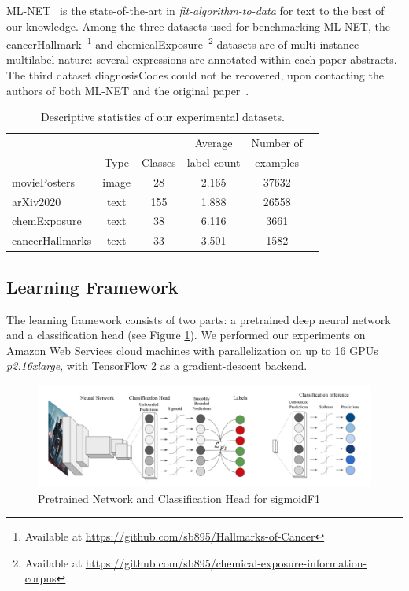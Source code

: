ML-NET~\cite{multitaskLabel} is the state-of-the-art in \emph{fit-algorithm-to-data} for text to the best of our knowledge. Among the three datasets used for benchmarking ML-NET, the cancerHallmark~\cite{cancerHallmarks}\footnote{Available at \url{https://github.com/sb895/Hallmarks-of-Cancer}} and chemicalExposure~\cite{chemExposure}\footnote{Available at \url{https://github.com/sb895/chemical-exposure-information-corpus}} datasets are of multi-instance multilabel nature: several expressions are annotated within each paper abstracts. The third dataset diagnosisCodes could not be recovered, upon contacting the authors of both ML-NET and the original paper~\cite{diagnosisCode}. 

\begin{table}
\caption{Descriptive statistics of our experimental datasets.}
\label{table:datasets}
\centering
\begin{tabular}{l ccccc}
\toprule
& & & Average & Number of \\
& Type & Classes & label count & examples \\
\midrule
moviePosters & image & 28 & 2.165 & 37632\\
arXiv2020 & text & 155 & 1.888 & 26558\\ 
chemExposure & text & 38 & 6.116 & 3661\\
cancerHallmarks\hspace{-.7em}  & text & 33 & 3.501 & 1582\\
\bottomrule
\end{tabular}
\end{table}

\subsection{Learning Framework}

The learning framework consists of two parts: a pretrained deep neural network and a classification head (see Figure \ref{fig:architecture}). We performed our experiments on Amazon Web Services cloud machines with parallelization on up to 16 GPUs \textit{p2.16xlarge}, with TensorFlow 2 as a gradient-descent backend.

\begin{figure}[htbp]
\centering
\includegraphics[width=.9\linewidth]{./images/architecture.png}
\caption{\label{fig:architecture}
Pretrained Network and Classification Head for sigmoidF1 }
\end{figure}


